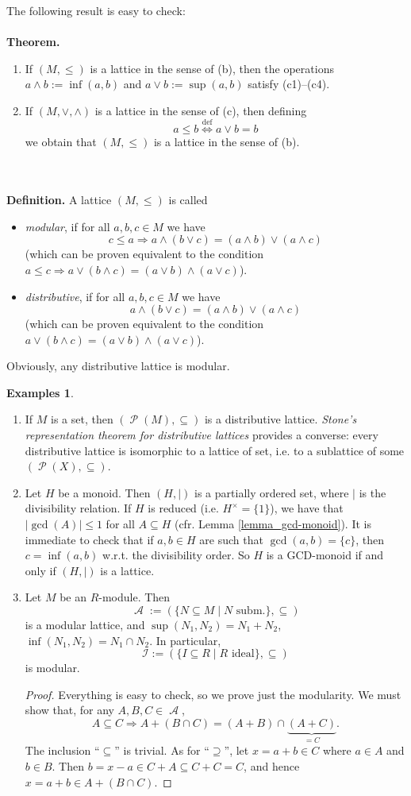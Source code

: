 \documentclass[12pt,a4paper]{report}
\theoremstyle{definition}
\newtheorem*{examples}{Examples}
\theoremstyle{num.custom-title}
\DeclareMathOperator{\A}{\mathcal{A}}
\DeclareMathOperator{\PP}{\mathcal{P}}
\DeclareMathOperator{\imp}{\Rightarrow}
\DeclareMathOperator{\sse}{\subseteq}
\newcommand{\I}{\mathcal{I}}
\newcommand{\IFF}{\Longleftrightarrow}
\begin{document}
The following result is easy to check:\\
\\
\textbf{Theorem.}
\begin{enumerate}
\item If $(M,\leq)$ is a lattice in the sense of (b), then the operations $a \wedge b := \inf(a,b)$ and $a \vee b := \sup(a,b)$ satisfy (c1)--(c4).
\item If $(M,\vee,\wedge)$ is a lattice in the sense of (c), then defining
\[
a \leq b \stackrel{\text{def}}{\IFF} a \vee b = b
\]
we obtain that $(M,\leq)$ is a lattice in the sense of (b).
\end{enumerate}\ \\
\\
\textbf{Definition.} A lattice $(M,\leq)$ is called
\begin{itemize}
\item \emph{modular}, if for all $a,b,c \in M$ we have
\[
c \leq a \imp a \wedge (b \vee c) = (a \wedge b) \vee (a \wedge c)
\]
(which can be proven equivalent to the condition $a \leq c \imp a \vee (b \wedge c) = (a \vee b) \wedge (a \vee c)$).
\item \emph{distributive}, if for all $a,b,c \in M$ we have
\[
a \wedge (b \vee c) = (a \wedge b) \vee (a \wedge c)
\]
(which can be proven equivalent to the condition $a \vee (b \wedge c) = (a \vee b) \wedge (a \vee c)$).
\end{itemize}
Obviously, any distributive lattice is modular.

\begin{examples}\ 
\begin{enumerate}
\item If $M$ is a set, then $(\PP(M),\sse)$ is a distributive lattice. \emph{Stone's representation theorem for distributive lattices} provides a converse: every distributive lattice is isomorphic to a lattice of set, i.e. to a sublattice of some $(\PP(X),\sse)$.
\item Let $H$ be a monoid. Then $(H,|)$ is a partially ordered set, where $|$ is the divisibility relation. If $H$ is reduced (i.e. $H^\times = \{1\}$), we have that $|\gcd(A)| \leq 1$ for all $A \sse H$ (cfr. Lemma \ref{lemma_gcd-monoid}). It is immediate to check that if $a,b \in H$ are such that $\gcd(a,b)=\{c\}$, then $c=\inf(a,b)$ w.r.t. the divisibility order. So $H$ is a GCD-monoid if and only if $(H,|)$ is a lattice.
\item Let $M$ be an $R$-module. Then
\[
\A := (\{N \sse M \mid N \text{ subm.}\}, \sse)
\]
is a modular lattice, and $\sup(N_1,N_2) = N_1+N_2$, $\inf(N_1,N_2)=N_1 \cap N_2$. In particular, 
\[
\I := (\{I \sse R \mid R \text{ ideal}\}, \sse)
\]
is modular.
\begin{proof}
Everything is easy to check, so we prove just the modularity. We must show that, for any $A,B,C \in \A$,
\[
A \sse C \imp A+(B \cap C) = (A+B) \cap \underbrace{(A+C)}_{=C}.
\]
The inclusion ``$\sse$'' is trivial. As for ``$\supseteq$'', let $x=a+b \in C$ where $a \in A$ and $b \in B$. Then $b=x-a \in C+A \sse C+C=C$, and hence $x=a+b \in A + (B \cap C)$.
\end{proof}
\end{enumerate}
\end{examples}
\end{document}
